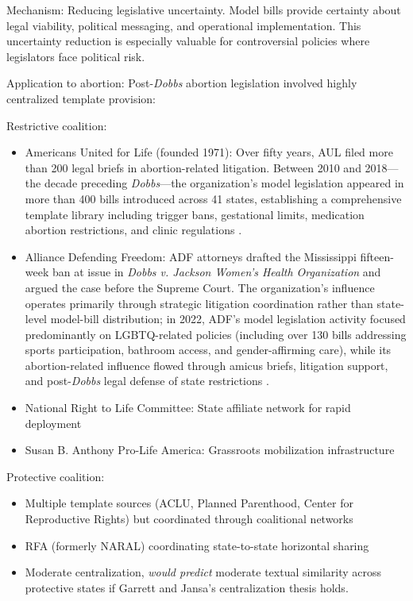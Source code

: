 Mechanism: Reducing legislative uncertainty. Model bills provide certainty about legal viability, political messaging, and operational implementation. This uncertainty reduction is especially valuable for controversial policies where legislators face political risk.

Application to abortion: Post-\emph{Dobbs} abortion legislation involved highly centralized template provision:

Restrictive coalition:
\begin{itemize}
\item Americans United for Life (founded 1971): Over fifty years, AUL filed more than 200 legal briefs in abortion-related litigation. Between 2010 and 2018---the decade preceding \emph{Dobbs}---the organization's model legislation appeared in more than 400 bills introduced across 41 states, establishing a comprehensive template library including trigger bans, gestational limits, medication abortion restrictions, and clinic regulations \parencite{beckerThisAntiabortionGroup2022, sheppardWhamBamSonogram2012}.
\item Alliance Defending Freedom: ADF attorneys drafted the Mississippi fifteen-week ban at issue in \emph{Dobbs v. Jackson Women's Health Organization} and argued the case before the Supreme Court. The organization's influence operates primarily through strategic litigation coordination rather than state-level model-bill distribution; in 2022, ADF's model legislation activity focused predominantly on LGBTQ-related policies (including over 130 bills addressing sports participation, bathroom access, and gender-affirming care), while its abortion-related influence flowed through amicus briefs, litigation support, and post-\emph{Dobbs} legal defense of state restrictions \parencite{kirkpatrickGroupThatOverturned2023, millerLandscapeTodaysAntiAbortion2024}.
\item National Right to Life Committee: State affiliate network for rapid deployment
\item Susan B. Anthony Pro-Life America: Grassroots mobilization infrastructure
\end{itemize}

Protective coalition:
\begin{itemize}
\item Multiple template sources (ACLU, Planned Parenthood, Center for Reproductive Rights) but coordinated through coalitional networks
\item RFA (formerly NARAL) coordinating state-to-state horizontal sharing
\item Moderate centralization, \textit{would predict} moderate textual similarity across protective states if Garrett and Jansa's centralization thesis holds.
\end{itemize}

